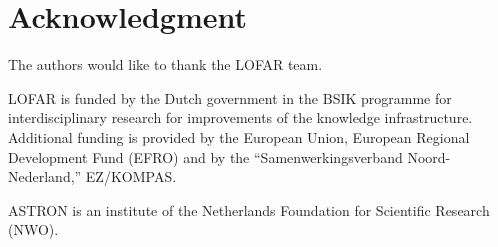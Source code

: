 \documentclass[journal]{IEEEtran}
\begin{document}
\section*{Acknowledgment}


The authors would like to thank the LOFAR team. 

LOFAR is funded by the Dutch government in the BSIK programme for
interdisciplinary research for improvements of the knowledge infrastructure.
Additional funding is provided by the European Union, European Regional
Development Fund (EFRO) and by the ``Samenwerkingsverband Noord-Nederland,''
EZ/KOMPAS.

ASTRON is an institute of the Netherlands Foundation for Scientific Research (NWO).

\ifCLASSOPTIONcaptionsoff
  \newpage
\fi





%
%
%
%
%



% 
\end{document}
